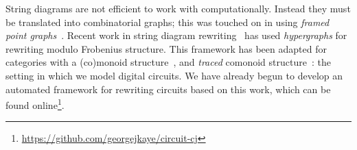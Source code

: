 \documentclass{lmcs}
\begin{document}
String diagrams are not efficient to work with computationally.
Instead they must be translated into combinatorial graphs; this was touched on
in \cite{ghica2017diagrammatic} using
\emph{framed point graphs}~\cite{kissinger2012pictures}.
Recent work in string diagram
rewriting~\cite{bonchi2022string,bonchi2022stringa,bonchi2022stringb} has used
\emph{hypergraphs} for rewriting modulo Frobenius structure.
This framework has been adapted for categories with a (co)monoid
structure~\cite{fritz2023free,milosavljevic2023string}, and \emph{traced}
comonoid structure~\cite{ghica2023rewriting}: the setting in which we model
digital circuits.
We have already begun to develop an automated framework for rewriting
circuits based on this work, which can be found
online\footnote{\url{https://github.com/georgejkaye/circuit-cj}}.



\end{document}

